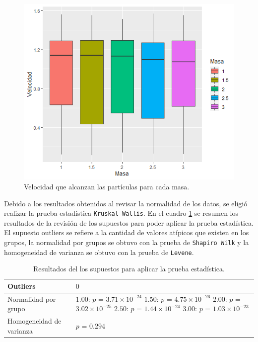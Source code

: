 \documentclass{article}
\begin{document}
\begin{figure} [h!]%
    \centering
    \includegraphics[width=150mm]{Figura6.png} %
    \caption{Velocidad que alcanzan las partículas para cada masa.}
    \label{f3}
\end{figure}

Debido a los resultados obtenidos al revisar la normalidad de los datos, se eligió realizar la prueba estadística \texttt{Kruskal Wallis}. En el cuadro \ref{Cuadro1} se  resumen los resultados de la revisión de los supuestos para poder aplicar la prueba estadística. El supuesto outliers se refiere a la cantidad de valores atípicos que existen en los grupos, la normalidad por grupos se obtuvo con la prueba de \texttt{Shapiro Wilk} y la homogeneidad de varianza se obtuvo con la prueba de \texttt{Levene}.

\begin{table}[h!]
\centering
\caption{Resultados del los supuestos para aplicar la prueba estadística.}
\smallskip

\begin{tabular}{ |p{2.1cm}|p{3.5cm}|}
 \hline
 Outliers & $0$ \\
 \hline
 Normalidad por grupo & $1.00$: $p$ = $3.71\times 10^{-24}$ $1.50$: $p$ = $4.75\times 10^{-26}$ $2.00$: $p$ = $3.02\times 10^{-25}$ $2.50$: $p$ = $1.44\times 10^{-24}$ $3.00$: $p$ = $1.03\times 10^{-23}$\\
 \hline
 Homogeneidad de varianza & $p$ = $0.294$ \\
 \hline
\end{tabular}
\label{Cuadro1}
\end{table}
\end{document}
